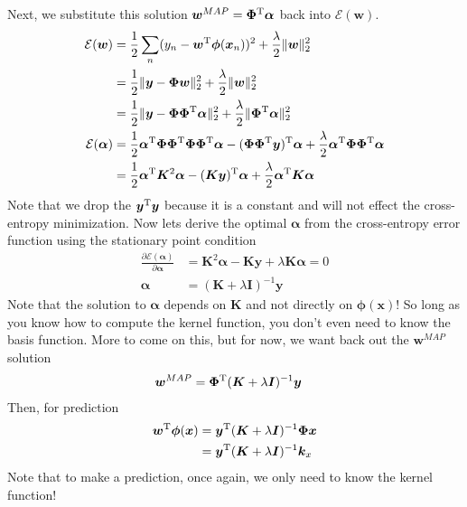\documentclass[11pt]{article}
\newcommand{\vct}[1]{\boldsymbol{#1}} %
\newcommand{\mat}[1]{\boldsymbol{#1}} %
\newcommand{\T}{^{\textrm T}} %
\begin{document}
Next, we substitute this solution $\vct{w}^{MAP} = \mat{\Phi}\T\vct{\alpha}$ back into $\mathcal{E}(\vct{w})$.
\begin{align*}
\mathcal{E}(\vct{w}) &= \frac{1}{2}\sum_n(y_n - \vct{w}\T\vct{\phi}(\vct{x}_n))^2 + \frac{\lambda}{2}\|\vct{w}\|_2^2\\
 &= \frac{1}{2} \|\vct{y} - \mat{\Phi}\vct{w}\|_2^2 + \frac{\lambda}{2}\|\vct{w}\|_2^2\\
 &= \frac{1}{2} \|\vct{y} - \mat{\Phi}\mat{\Phi}\T\vct{\alpha}\|_2^2 + \frac{\lambda}{2}\|\mat{\Phi}\T\vct{\alpha}\|_2^2\\
\mathcal{E}(\vct{\alpha}) &= \frac{1}{2} \vct{\alpha}\T \mat{\Phi}\mat{\Phi}\T\mat{\Phi}\mat{\Phi}\T\vct{\alpha} - (\mat{\Phi}\mat{\Phi}\T\vct{y})\T\vct{\alpha} + \frac{\lambda}{2}\vct{\alpha}\T\mat{\Phi}\mat{\Phi}\T\vct{\alpha}\\
&= \frac{1}{2} \vct{\alpha}\T \mat{K}^2\vct{\alpha} - (\mat{K}\vct{y})\T\vct{\alpha} + \frac{\lambda}{2}\vct{\alpha}\T\mat{K}\vct{\alpha}
\end{align*}
Note that we drop the $\vct{y}\T\vct{y}$ because it is a constant and will not effect the cross-entropy minimization. Now lets derive the optimal $\vct{\alpha}$ from the cross-entropy error function using the stationary point condition
\begin{align*}
\frac{ \partial \mathcal{E}(\vct{\alpha})}{\partial \vct{\alpha}} &=  \mat{K}^2\vct{\alpha} - \mat{K}\vct{y} + \lambda\mat{K}\vct{\alpha} = 0\\
\vct{\alpha} &= (\mat{K} + \lambda \mat{I})^{-1}\vct{y}
\end{align*}
Note that the solution to $\vct{\alpha}$ depends on $\mat{K}$ and not directly on $\vct{\phi}(\vct{x})$! So long as you know how to compute the kernel function, you don't even need to know the basis function. More to come on this, but for now, we want back out the $\vct{w}^{MAP}$ solution
\begin{align*}
\vct{w}^{MAP} &= \mat{\Phi}\T(\mat{K} + \lambda \mat{I})^{-1}\vct{y}
\end{align*}
Then, for prediction
\begin{align*}
\vct{w}\T\vct{\phi}(\vct{x}) &=\vct{y}\T(\mat{K} + \lambda \mat{I})^{-1}  \mat{\Phi} \vct{x} \\
 &=\vct{y}\T(\mat{K} + \lambda \mat{I})^{-1} \vct{k}_x \\
\end{align*}
Note that to make a prediction, once again, we only need to know the kernel function!
\end{document}
